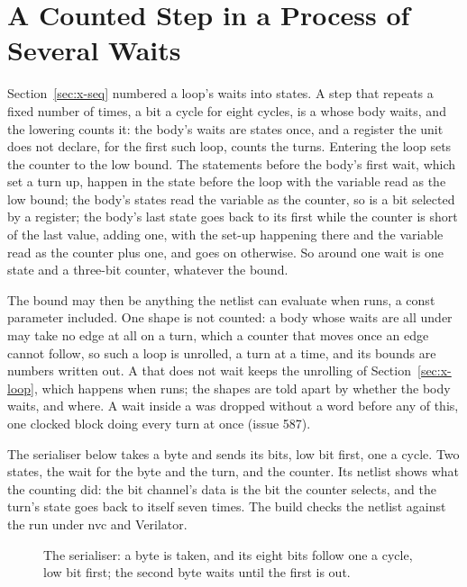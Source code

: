 \section{A Counted Step in a Process of Several Waits}
\label{sec:x-serial}

Section~\ref{sec:x-seq} numbered a loop's waits into states. A step
that repeats a fixed number of times, a bit a cycle for eight cycles,
is a  whose body waits, and the lowering counts it: the
body's waits are states once, and a register the unit does not
declare,  for the first such loop, counts the turns.
Entering the loop sets the counter to the low bound. The statements
before the body's first wait, which set a turn up, happen in the
state before the loop with the variable read as the low bound; the
body's states read the variable as the counter, so  is
a bit selected by a register; the body's last state goes back to its
first while the counter is short of the last value, adding one, with
the set-up happening there and the variable read as the counter plus
one, and goes on otherwise. So  around one wait
is one state and a three-bit counter, whatever the bound.

The bound may then be anything the netlist can evaluate when
 runs, a const parameter included. One shape is not
counted: a body whose waits are all under  may take no
edge at all on a turn, which a counter that moves once an edge
cannot follow, so such a loop is unrolled, a turn at a time, and its
bounds are numbers written out. A  that does not wait
keeps the unrolling of Section~\ref{sec:x-loop}, which happens when
 runs; the shapes are told apart by whether the body
waits, and where. A wait inside a  was dropped without a
word before any of this, one clocked block doing every turn at once
(issue 587).

The serialiser below takes a byte and sends its bits, low bit first,
one a cycle. Two states, the wait for the byte and the turn, and the
counter. Its netlist shows what the counting did: the bit channel's
data is the bit the counter selects, and the turn's state goes back
to itself seven times. The build checks the netlist against the run
under nvc and Verilator.

\begin{figure}[htbp]
\centering

\caption{The serialiser: a byte is taken, and its eight bits follow
one a cycle, low bit first; the second byte waits until the first is
out.}
\label{fig:x-serial}
\end{figure}




